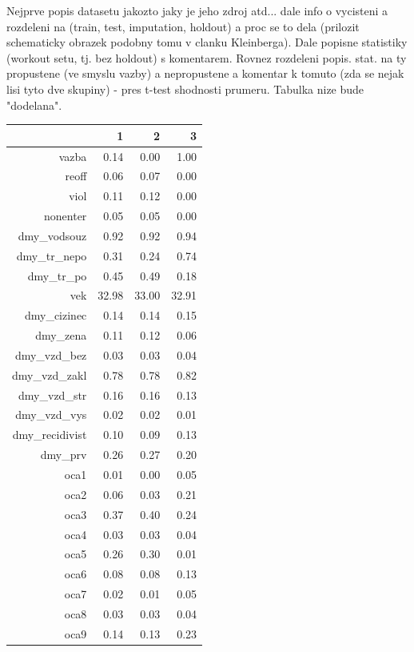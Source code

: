 \documentclass[12pt, twoside]{book} %
\begin{document}
Nejprve popis datasetu jakozto jaky je jeho zdroj atd... dale info o vycisteni a  rozdeleni na (train, test, imputation, holdout) a proc se to dela (prilozit schematicky obrazek podobny tomu v clanku Kleinberga). Dale popisne statistiky (workout setu, tj. bez holdout) s komentarem. Rovnez rozdeleni popis. stat. na ty propustene (ve smyslu vazby) a nepropustene a komentar k tomuto (zda se nejak lisi tyto dve skupiny) -  pres t-test shodnosti prumeru. Tabulka nize bude "dodelana". 


\begin{table}[ht]
\centering
\begin{tabular}{rrrr}
  \hline
 & 1 & 2 & 3 \\ 
  \hline
vazba & 0.14 & 0.00 & 1.00 \\ 
  reoff & 0.06 & 0.07 & 0.00 \\ 
  viol & 0.11 & 0.12 & 0.00 \\ 
  nonenter & 0.05 & 0.05 & 0.00 \\ 
  dmy\_vodsouz & 0.92 & 0.92 & 0.94 \\ 
  dmy\_tr\_nepo & 0.31 & 0.24 & 0.74 \\ 
  dmy\_tr\_po & 0.45 & 0.49 & 0.18 \\ 
  vek & 32.98 & 33.00 & 32.91 \\ 
  dmy\_cizinec & 0.14 & 0.14 & 0.15 \\ 
  dmy\_zena & 0.11 & 0.12 & 0.06 \\ 
  dmy\_vzd\_bez & 0.03 & 0.03 & 0.04 \\ 
  dmy\_vzd\_zakl & 0.78 & 0.78 & 0.82 \\ 
  dmy\_vzd\_str & 0.16 & 0.16 & 0.13 \\ 
  dmy\_vzd\_vys & 0.02 & 0.02 & 0.01 \\ 
  dmy\_recidivist & 0.10 & 0.09 & 0.13 \\ 
  dmy\_prv & 0.26 & 0.27 & 0.20 \\ 
  oca1 & 0.01 & 0.00 & 0.05 \\ 
  oca2 & 0.06 & 0.03 & 0.21 \\ 
  oca3 & 0.37 & 0.40 & 0.24 \\ 
  oca4 & 0.03 & 0.03 & 0.04 \\ 
  oca5 & 0.26 & 0.30 & 0.01 \\ 
  oca6 & 0.08 & 0.08 & 0.13 \\ 
  oca7 & 0.02 & 0.01 & 0.05 \\ 
  oca8 & 0.03 & 0.03 & 0.04 \\ 
  oca9 & 0.14 & 0.13 & 0.23 \\ 

\end{tabular}
\end{table}
\end{document}
